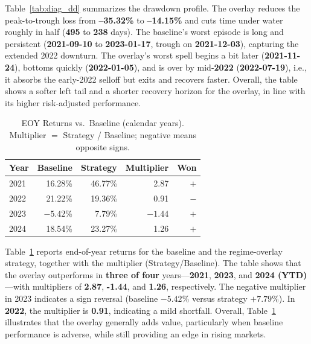 Table~\ref{tab:diag_dd} summarizes the drawdown profile. The overlay reduces the peak-to-trough
loss from \textbf{--35.32\%} to \textbf{--14.15\%} and cuts time under water roughly in half
(\textbf{495} to \textbf{238} days). The baseline’s worst episode is long and persistent
(\textbf{2021-09-10} to \textbf{2023-01-17}, trough on \textbf{2021-12-03}), capturing the extended
2022 downturn. The overlay’s worst spell begins a bit later (\textbf{2021-11-24}), bottoms quickly
(\textbf{2022-01-05}), and is over by mid-\textbf{2022} (\textbf{2022-07-19}), i.e., it absorbs the
early-2022 selloff but exits and recovers faster. Overall, the table shows a softer left tail and a
shorter recovery horizon for the overlay, in line with its higher risk-adjusted performance.

\begin{table}[t]
\centering
\caption{EOY Returns vs.\ Baseline (calendar years). Multiplier $=$ Strategy / Baseline; negative means opposite signs.}
\label{tab:eoy}
\small
\begin{tabular}{lrrrr}
\toprule
Year & Baseline & Strategy & Multiplier & Won \\
\midrule
2021 & 16.28\% & 46.77\% & 2.87  & $+$ \\
2022 & 21.22\% & 19.36\% & 0.91  & $-$ \\
2023 & $-5.42$\% & 7.79\% & $-1.44$ & $+$ \\
2024 & 18.54\% & 23.27\% & 1.26  & $+$ \\
\bottomrule
\end{tabular}
\end{table}

Table~\ref{tab:eoy} reports end-of-year returns for the baseline and the regime-overlay strategy, together with the multiplier (Strategy/Baseline). The table shows that the overlay outperforms in \textbf{three of four} years—\textbf{2021}, \textbf{2023}, and \textbf{2024 (YTD)}—with multipliers of \textbf{2.87}, \textbf{-1.44}, and \textbf{1.26}, respectively. The negative multiplier in 2023 indicates a sign reversal (baseline \(-5.42\%\) versus strategy \(+7.79\%\)). In \textbf{2022}, the multiplier is \textbf{0.91}, indicating a mild shortfall. Overall, Table~\ref{tab:eoy} illustrates that the overlay generally adds value, particularly when baseline performance is adverse, while still providing an edge in rising markets.


